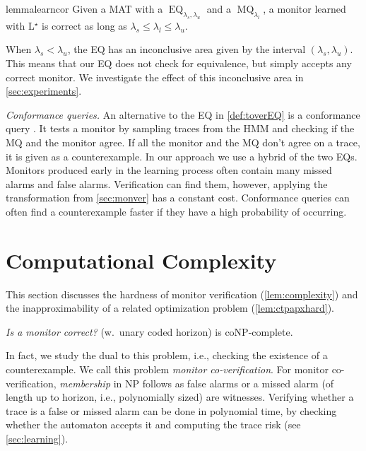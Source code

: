\documentclass[runningheads]{llncs}
\newcommand{\EQ}{\operatorname{EQ}}
\newcommand{\MQ}{\operatorname{MQ}}
\renewcommand{\paragraph}[1]{\smallskip\noindent\emph{#1}}
\begin{document}
\begin{restatable}{lemma}{learncor}
    Given a MAT with a $\EQ_{\lambda_s, \lambda_u}$ and a $\MQ_{\lambda_l}$, a monitor learned with L$^\star$ is correct as long as $\lambda_s \leq \lambda_l \leq \lambda_u$.
\end{restatable}
\noindent When $\lambda_s < \lambda_u$, the EQ has an inconclusive area given by the interval $(\lambda_s, \lambda_u)$.
This means that our EQ does not check for equivalence, but simply accepts any correct monitor. We investigate the effect of this inconclusive area in \cref{sec:experiments}.

\paragraph{Conformance queries.}
An alternative to the EQ in \cref{def:toverEQ} is a conformance query \cite{groceAdaptiveModelChecking2002}. It tests a monitor by sampling traces from the HMM and checking if the MQ and the monitor agree. If all the monitor and the MQ don't agree on a trace, it is given as a counterexample. In our approach we use a hybrid of the two EQs. Monitors produced early in the learning process often contain many missed alarms and false alarms. Verification can find them, however, applying the transformation from \cref{sec:monver} has a constant cost. Conformance queries can often find a counterexample faster if they have a high probability of occurring.

\section{Computational Complexity}\label{sec:compl}
This section discusses the hardness of monitor verification (\cref{lem:complexity}) and the inapproximability of a related optimization problem (\cref{lem:ctpapxhard}).
\begin{theorem}
    \label{lem:complexity}
    \emph{Is a monitor correct?} (w.\ unary coded horizon) is coNP-complete.
\end{theorem}
In fact, we study the dual to this problem, i.e., checking the existence of a counterexample. We call this problem \emph{monitor co-verification}. For monitor co-verification, \emph{membership} in NP follows as  false alarms or a missed alarm (of length up to horizon, i.e., polynomially sized) are witnesses.
Verifying whether a trace is a false or missed alarm can be done in polynomial time, by checking whether the automaton accepts it and computing the trace risk (see \cref{sec:learning}).
\end{document}
